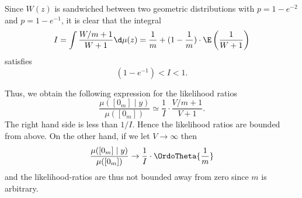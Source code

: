\documentclass[12pt]{scrartcl}
\begin{document}
Since $W(z)$ is sandwiched between two geometric distributions with $
p=1-e^{-2}$ and $p=1-e^{-1}$, it is clear that the integral 
\[
  I=\int \frac{W/m+1}{W+1} \d\mu(z) = \frac 1m
  + (1-\frac1m) \cdot \E\left(\frac{1}{W+1}\right)
\]
satisfies 
\[
 (1-e^{-1}) <  I < 1. 
\]

Thus, we obtain the following expression for the likelihood ratios 
\[
  \frac{\mu([0_m]\mid y)}{\mu([0_m])} \simeq \frac1I \cdot \frac{V/m+1}{V+1}.
\] 
The right hand side is less than $1/I$. Hence
the likelihood ratios are bounded from above. On the other hand, if we let
$V\to\infty$ then
$$  \frac{\mu([0_m]\mid y)}{\mu([0_m])} \to \frac1I \cdot \OrdoTheta{\frac 1m} $$
and the likelihood-ratios are thus not bounded away from zero since $m$ is
arbitrary.
\end{document}
